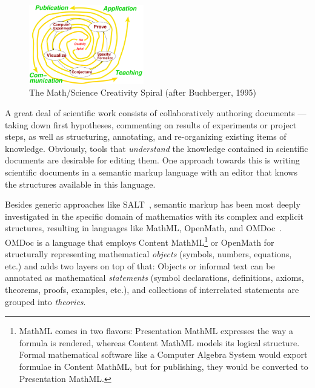 \documentclass{llncs}
\begin{document}
\begin{figure}
  \centering
  \vspace{-.5cm}
  \includegraphics[width=5cm]{creativity-spiral}
  \vspace{-.5cm}
  \caption{The Math/Science Creativity Spiral (after Buchberger, 1995)}
  \label{fig:creativity-spiral}
\end{figure}
A great deal of scientific work consists of collaboratively authoring documents --- taking
down first hypotheses, commenting on results of experiments or project steps, as well as
structuring, annotating, and re-organizing existing items of knowledge.  Obviously, tools
that \emph{understand} the knowledge contained in scientific documents are desirable for
editing them.  One approach towards this is writing scientific documents in a semantic
markup language with an editor that knows the structures available in this language.

Besides generic approaches like SALT~\cite{Groza:SALT07}, semantic markup has been most
deeply investigated in the specific domain of mathematics with its complex and explicit
structures, resulting in languages like MathML, OpenMath, and
OMDoc~\cite{Kohlhase:omdoc1.2}.  OMDoc is a language that employs Content
MathML\footnote{MathML comes in two flavors: Presentation MathML expresses the way a
  formula is rendered, whereas Content MathML models its logical structure.  Formal
  mathematical software like a Computer Algebra System would export formulae in Content
  MathML, but for publishing, they would be converted to Presentation MathML.} or OpenMath
for structurally representing mathematical \emph{objects} (symbols, numbers, equations,
etc.) and adds two layers on top of that: Objects or informal text can be annotated as
mathematical \emph{statements} (symbol declarations, definitions, axioms, theorems,
proofs, examples, etc.), and collections of interrelated statements are grouped into
\emph{theories}.
\end{document}
